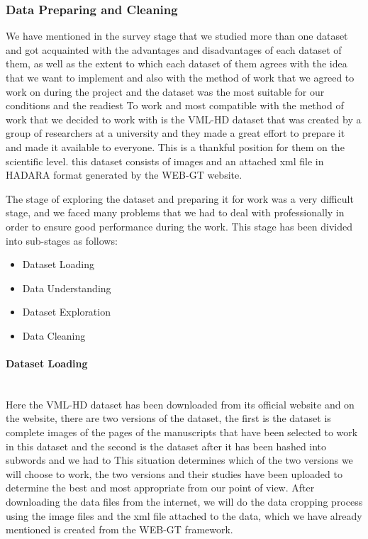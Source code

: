 \subsubsection{Data Preparing and Cleaning}

We have mentioned in the survey stage that we studied more than one dataset and got acquainted with the advantages and disadvantages of each dataset of them, as well as the extent to which each dataset of them agrees with the idea that we want to implement and also with the method of work that we agreed to work on during the project and the dataset was the most suitable for our conditions and the readiest To work and most compatible with the method of work that we decided to work with is the VML-HD dataset that was created by a group of researchers at a university and they made a great effort to prepare it and made it available to everyone. This is a thankful position for them on the scientific level. this dataset consists of images and an attached xml file in HADARA format generated by the WEB-GT website.

The stage of exploring the dataset and preparing it for work was a very difficult stage, and we faced many problems that we had to deal with professionally in order to ensure good performance during the work.
This stage has been divided into sub-stages as follows:
\begin{itemize}
  \item Dataset Loading
  \item Data Understanding
  \item Dataset Exploration
  \item Data Cleaning
\end{itemize}

\paragraph{Dataset Loading}\mbox{}\\
Here the VML-HD dataset has been downloaded from its official website and on the website, there are two versions of the dataset, the first is the dataset is complete images of the pages of the manuscripts that have been selected to work in this dataset and the second is the dataset after it has been hashed into subwords and we had to This situation determines which of the two versions we will choose to work, the two versions and their studies have been uploaded to determine the best and most appropriate from our point of view.
After downloading the data files from the internet, we will do the data cropping process using the image files and the xml file attached to the data, which we have already mentioned is created from the WEB-GT framework.

